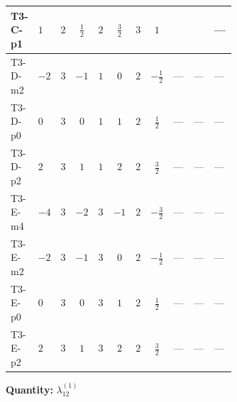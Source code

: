 \documentclass[8pt]{article}
\begin{document}
\begin{landscape}
\begin{longtable}{@{}llcccccc >{\raggedright\arraybackslash}p{0.21\linewidth} >{\raggedright\arraybackslash}p{0.21\linewidth} >{\raggedright\arraybackslash}p{0.21\linewidth}@{}}
\midrule
T3-C-p1 & $1$ & $2$ & $\frac{1}{2}$ & $2$ & $\frac{3}{2}$ & $3$ & $1$ & \scriptsize\adjustbox{max width=\linewidth}{$\begin{gathered} +\frac{27 {g_1}^4}{4}\end{gathered}$} & \scriptsize\adjustbox{max width=\linewidth}{$\begin{gathered} +\frac{3 {\lambda_{12}^{(A)}}^2}{4}\end{gathered}$} & --- \\
\midrule
T3-D-m2 & $-2$ & $3$ & $-1$ & $1$ & $0$ & $2$ & $-\frac{1}{2}$ & --- & --- & --- \\
\midrule
T3-D-p0 & $0$ & $3$ & $0$ & $1$ & $1$ & $2$ & $\frac{1}{2}$ & --- & --- & --- \\
\midrule
T3-D-p2 & $2$ & $3$ & $1$ & $1$ & $2$ & $2$ & $\frac{3}{2}$ & --- & --- & --- \\
\midrule
T3-E-m4 & $-4$ & $3$ & $-2$ & $3$ & $-1$ & $2$ & $-\frac{3}{2}$ & --- & --- & --- \\
\midrule
T3-E-m2 & $-2$ & $3$ & $-1$ & $3$ & $0$ & $2$ & $-\frac{1}{2}$ & --- & --- & --- \\
\midrule
T3-E-p0 & $0$ & $3$ & $0$ & $3$ & $1$ & $2$ & $\frac{1}{2}$ & --- & --- & --- \\
\midrule
T3-E-p2 & $2$ & $3$ & $1$ & $3$ & $2$ & $2$ & $\frac{3}{2}$ & --- & --- & --- \\
\midrule
\bottomrule
\end{longtable}
\clearpage
\noindent\textbf{Quantity: }$\lambda_{12}^{(1)}$\par\smallskip

\end{landscape}
\end{document}
